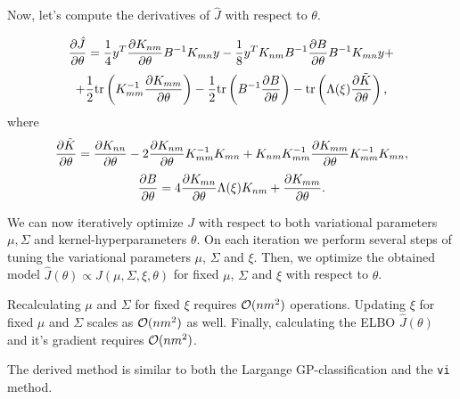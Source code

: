 Now, let's compute the derivatives of $\hat J$ with respect to $\theta$.

$$\frac{\partial \hat J}{\partial \theta} = \frac 1 4 y^T \frac{\partial K_{nm}}{\partial \theta} B^{-1} K_{mn} y - \frac 1 8 y^T K_{nm} B^{-1} \frac{\partial B}{\partial \theta} B^{-1} K_{mn} y + $$
$$ + \frac 1 2 \mbox{tr}\left(K_{mm}^{-1} \frac{\partial K_{mm}}{\partial \theta}\right) - \frac 1 2 \mbox{tr}\left(B^{-1} \frac{\partial B}{\partial \theta}\right) - \mbox{tr} \left(\Lambda(\xi) \frac{\partial \tilde K}{\partial \theta}\right),$$
where
$$\frac{\partial \tilde K}{\partial \theta} = \frac{\partial K_{nn}}{\partial \theta} - 2 \frac{\partial K_{nm}}{\partial \theta} K_{mm}^{-1} K_{mn} + K_{nm} K_{mm}^{-1} \frac{\partial K_{mm}}{\partial \theta} K_{mm}^{-1} K_{mn},$$
$$\frac{\partial B}{\partial \theta} = 4 \frac{\partial K_{mn}}{\partial \theta} \Lambda(\xi) K_{nm} + \frac{\partial K_{mm}}{\partial \theta}.$$

We can now iteratively optimize $J$ with respect to both variational parameters $\mu, \Sigma$ and kernel-hyperparameters $\theta$. On each iteration we perform several steps of tuning the variational parameters $\mu$, $\Sigma$ and $\xi$. Then, we optimize the obtained model $\hat J(\theta) \propto J(\mu, \Sigma, \xi, \theta)$ for fixed $\mu$, $\Sigma$ and $\xi$ with respect to $\theta$.

Recalculating $\mu$ and $\Sigma$ for fixed $\xi$ requires $\mathcal{O}(nm^2)$ operations. Updating $\xi$ for fixed $\mu$ and $\Sigma$ scales as $\mathcal{O}(nm^2)$ as well. Finally, calculating the ELBO $\hat J(\theta)$ and it's gradient requires $\mathcal{O}(nm^2)$.

The derived method is similar to both the Largange GP-classification and the \lstinline{vi} method.
